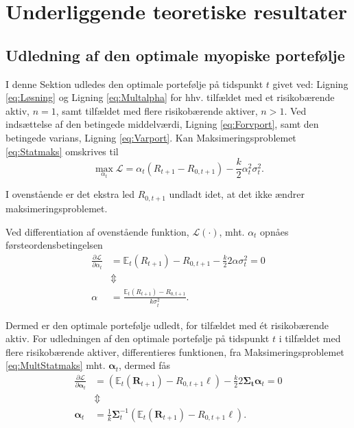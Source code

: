 \documentclass[
  a4paper,
  oneside]{memoir}
\begin{document}
\hypertarget{underliggende-teoretiske-resultater}{%
\chapter{Underliggende teoretiske resultater}\label{underliggende-teoretiske-resultater}}

\hypertarget{udlmyo}{%
\section{Udledning af den optimale myopiske portefølje}\label{udlmyo}}

I denne Sektion udledes den optimale portefølje på tidspunkt \(t\) givet ved: Ligning \eqref{eq:Løsning} og Ligning \eqref{eq:Multalpha} for hhv. tilfældet med et risikobærende aktiv, \(n=1\), samt tilfældet med flere risikobærende aktiver, \(n>1\). Ved indsættelse af den betingede middelværdi, Ligning \eqref{eq:Forvport}, samt den betingede varians, Ligning \eqref{eq:Varport}. Kan Maksimeringsproblemet \eqref{eq:Statmaks} omskrives til
\[\max_{\alpha_t} \mathcal{L}=\alpha_t\left(R_{t+1} - R_{0,t+1}\right)-\frac{k}{2}\alpha_t^2\sigma_t^2.\]

I ovenstående er det ekstra led \(R_{0,t+1}\) undladt idet, at det ikke ændrer maksimeringsproblemet.

Ved differentiation af ovenstående funktion, \(\mathcal{L}(\cdot)\), mht. \(\alpha_t\) opnåes førsteordensbetingelsen
\begin{align*}
\frac{\partial \mathcal{L}}{\partial \alpha_t} &= \mathbb{E}_t(R_{t+1}) - R_{0,t+1} - \frac{k}{2}2\alpha\sigma_t^2=0\\
&\Updownarrow\\
\alpha&=\frac{\mathbb{E}_t\left(R_{t+1}\right)-R_{0,t+1}}{k\sigma_t^2}.
\end{align*}

Dermed er den optimale portefølje udledt, for tilfældet med ét risikobærende aktiv. For udledningen af den optimale portefølje på tidspunkt \(t\) i tilfældet med flere risikobærende aktiver, differentieres funktionen, fra Maksimeringsproblemet \eqref{eq:MultStatmaks} mht. \(\bm{\alpha}_t\), dermed fås
\begin{align*}
\frac{\partial \mathcal{L}}{\partial \bm{\alpha}_t} &= (\mathbb{E}_t(\bm{R}_{t+1})- R_{0,t+1}\bm{\ell}) - \frac{k}{2}2\bm{\Sigma_t}\bm{\alpha}_t = 0\\
&\Updownarrow\\
\bm{\alpha}_t&=\frac{1}{k}\bm{\Sigma}_t^{-1}(\mathbb{E}_t(\bm{R}_{t+1})-R_{0,t+1}\bm{\ell}).
\end{align*}
\end{document}
